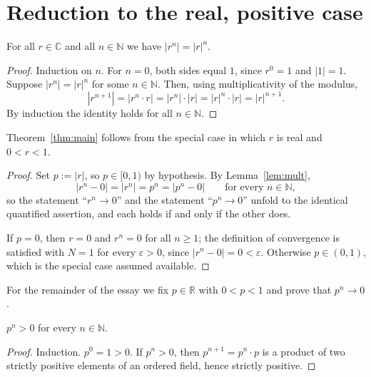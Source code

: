 \documentclass{essay}
\begin{document}
\section{Reduction to the real, positive case}

\begin{lemma}\label{lem:mult}
For all $r \in \mathbb{C}$ and all $n \in \mathbb{N}$ we have $|r^{n}| = |r|^{n}$.
\end{lemma}

\begin{proof}
Induction on $n$. For $n = 0$, both sides equal $1$, since $r^{0} = 1$ and
$|1| = 1$. Suppose $|r^{n}| = |r|^{n}$ for some $n \in \mathbb{N}$. Then, using
multiplicativity of the modulus,
\[
  |r^{n+1}| = |r^{n} \cdot r| = |r^{n}| \cdot |r| = |r|^{n} \cdot |r| = |r|^{n+1}.
\]
By induction the identity holds for all $n \in \mathbb{N}$.
\end{proof}

\begin{proposition}[Reduction]\label{prop:reduction}
Theorem~\ref{thm:main} follows from the special case in which $r$ is real and
$0 < r < 1$.
\end{proposition}

\begin{proof}
Set $p := |r|$, so $p \in [0,1)$ by hypothesis. By Lemma~\ref{lem:mult},
\[
  |r^{n} - 0| = |r^{n}| = p^{n} = |p^{n} - 0|
  \qquad \text{for every } n \in \mathbb{N},
\]
so the statement ``$r^{n} \to 0$'' and the statement ``$p^{n} \to 0$'' unfold to
the identical quantified assertion, and each holds if and only if the other does.

If $p = 0$, then $r = 0$ and $r^{n} = 0$ for all $n \geq 1$; the definition of
convergence is satisfied with $N = 1$ for every $\varepsilon > 0$, since
$|r^{n} - 0| = 0 < \varepsilon$. Otherwise $p \in (0,1)$, which is the special case
assumed available.
\end{proof}

For the remainder of the essay we fix $p \in \mathbb{R}$ with $0 < p < 1$ and prove
that $p^{n} \to 0$.

\begin{lemma}\label{lem:positive}
$p^{n} > 0$ for every $n \in \mathbb{N}$.
\end{lemma}

\begin{proof}
Induction. $p^{0} = 1 > 0$. If $p^{n} > 0$, then $p^{n+1} = p^{n} \cdot p$ is a
product of two strictly positive elements of an ordered field, hence strictly
positive.
\end{proof}
\end{document}
